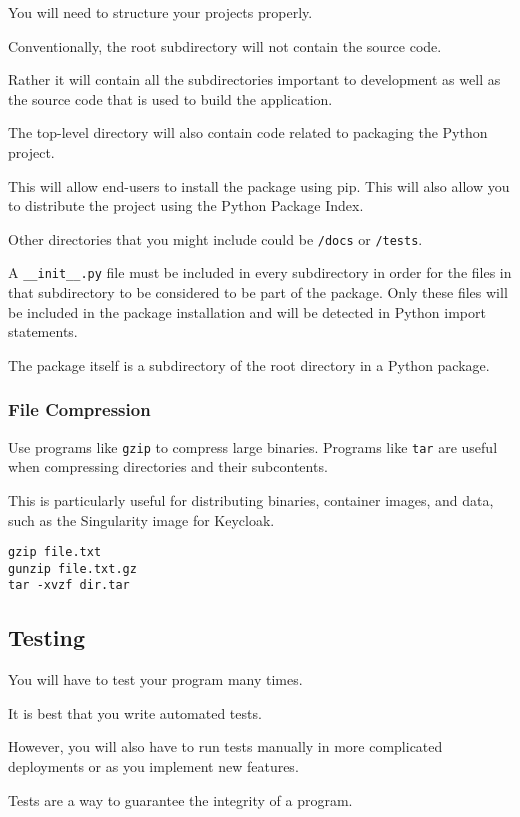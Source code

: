 \documentclass{article}
\begin{document}
You will need to structure your projects properly.

Conventionally, the root subdirectory will not contain the 
source code.

Rather it will contain all the subdirectories important to
development as well as the source code that is used 
to build the application.

The top-level directory will also contain
code related to packaging the Python project.

This will allow end-users to install the package using pip.
This will also allow you to distribute the project using 
the Python Package Index.

Other directories that you might include could be
\texttt{/docs} or \texttt{/tests}. 

A \texttt{\_\_init\_\_.py} file must be included in every subdirectory
in order for the files
in that subdirectory to be considered to be part of the package.
Only these files will be included in the package installation
and will be detected in Python import statements.

The package itself is a subdirectory of the root directory
in a Python package.


\subsubsection{File Compression}

Use programs like \texttt{gzip} to compress large binaries.
Programs like \texttt{tar} are useful when compressing directories 
and their subcontents.

This is particularly useful for distributing binaries,
container images, and data, such as the Singularity 
image for Keycloak.
\begin{verbatim}
gzip file.txt
gunzip file.txt.gz
tar -xvzf dir.tar
\end{verbatim}

\subsection{Testing}

You will have to test your program many times.

It is best that you write automated tests.

However, you will also have to run tests manually
in more complicated deployments or as you implement
new features.

Tests are a way to guarantee the integrity of a program.
\end{document}
